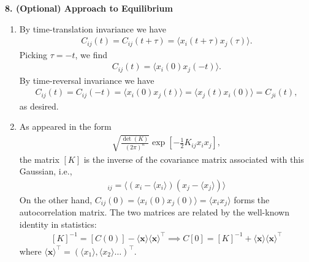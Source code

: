 \documentclass{article}
\theoremstyle{definition}
\newcommand{\f}[2]{\frac{#1}{#2}}
\newcommand{\lb}{\left[}
\newcommand{\rb}{\right]}
\begin{document}
\noindent \textbf{8. (Optional) Approach to Equilibrium}
\begin{enumerate}[label=(\alph*)]
	\item By time-translation invariance we have
	\begin{align*}
	C_{ij}(t) = C_{ij}(t+\tau) = \langle x_i(t+\tau) x_j (\tau) \rangle.
	\end{align*}
	Picking $\tau = -t$, we find 
	\begin{align*}
	C_{ij}(t) = \langle x_i(0)x_j(-t)\rangle.
	\end{align*}
	By time-reversal invariance we have
	\begin{align*}
	C_{ij}(t) = C_{ij}(-t) = \langle  x_i (0) x_j(t) \rangle = \langle  x_j (t) x_i(0) \rangle = C_{ji}(t),
	\end{align*}
	as desired. 
	
	\item As appeared in the form 
	\begin{align*}
	\sqrt{\f{\det(K)}{(2\pi)^{n}}} \exp\lb -\f{1}{2}K_{ij} x_i x_j \rb,
	\end{align*}
	the matrix $[K]$ is the inverse of the covariance matrix associated with this Gaussian, i.e., 
	\begin{align*}
	[K^{-1}]_{ij} = \langle (x_i -\langle x_i \rangle)(x_j - \langle x_j \rangle) \rangle 
	\end{align*}
	On the other hand, $C_{ij}(0) = \langle x_i(0)x_j(0) \rangle = \langle x_i x_j \rangle $ forms the autocorrelation matrix. The two matrices are related by the well-known identity in statistics:
	\begin{align*}
	\boxed{[K]^{-1} = [C(0)] - \langle \mathbf{x}\rangle \langle \mathbf{x}\rangle^\top \implies C[0] = [K]^{-1} + \langle \mathbf{x}\rangle \langle \mathbf{x}\rangle^\top}
	\end{align*}
	where $\langle \mathbf{x}\rangle^\top = (\langle x_1 \rangle, \langle x_2 \rangle \dots  )^\top$. 
	
	
	

\end{enumerate}
\end{document}
